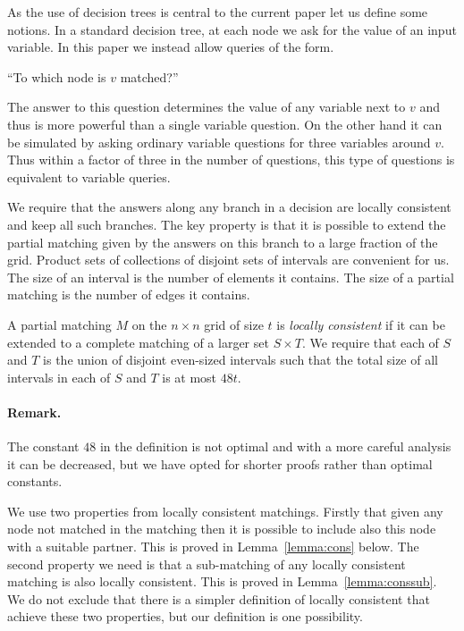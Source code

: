 \documentclass{article}\usepackage[a4paper,margin=20mm]{geometry}
\begin{document}
As the use of decision trees is central to the current
paper let us define some notions.
In a standard decision tree, at each node we ask for 
the value of an input variable.  In this paper we instead allow
queries of the form.
\begin{center}
``To which node is $v$ matched?''
\end{center}

The answer to this question determines the value
of any variable next to $v$ and thus is more powerful
than a single variable question.  On the other hand 
it can be simulated by asking
ordinary variable questions for three variables
around $v$.  Thus within a factor of three in the
number of questions, this type of questions is equivalent
to variable queries.

We require that the answers along any branch in a decision
are locally consistent and keep all such branches.
The key property is that it is possible to extend
the partial matching given by the answers on this branch
to a large fraction of the grid. 
Product sets of collections of disjoint sets
of intervals are convenient for us.
The size of an interval is the number of elements
it contains.  The size of a partial matching is the
number of edges it contains.

\begin{definition}\label{def:consistent}
A partial matching $M$ on the $n \times n$ grid of
size $t$ is {\em locally consistent} 
if it can be extended to a complete
matching of a larger set $S \times T$.
We require that each of $S$ and $T$ is the union
of disjoint even-sized intervals such that the total
size of all intervals in each of $S$ and $T$ is at most $48t$.
\end{definition}

\paragraph{Remark.}  The constant $48$ in the definition is not optimal
and with a more careful analysis it can be decreased, but we
have opted for shorter proofs rather than optimal constants.

\medskip
We use two properties from locally consistent
matchings.  Firstly that given any node not matched
in the matching then it is possible to include
also this node with a suitable partner.  This is proved
in Lemma~\ref{lemma:cons} below.   The second property 
we need is that a sub-matching of any locally consistent
matching is also locally consistent.  This is proved
in Lemma~\ref{lemma:conssub}.  We do not exclude
that there is a simpler definition of locally consistent 
that achieve these two properties, but our
definition is one possibility.
\end{document}
